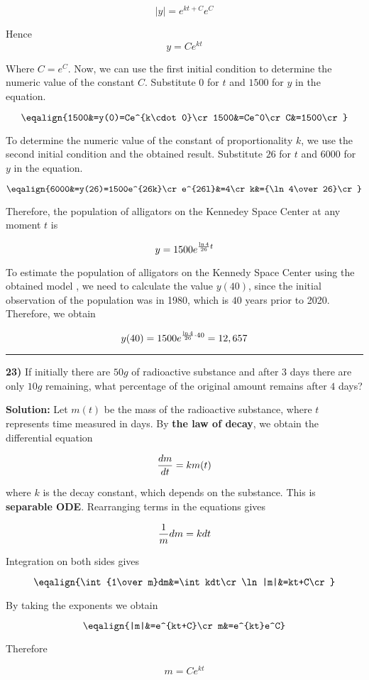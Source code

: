 $$|y|=e^{kt+C}e^C$$

Hence
$$y=Ce^{kt}$$

Where $C=e^C$. Now, we can use the first initial condition to determine the numeric value of the constant $C$. Substitute $0$ for $t$ and $1500$ for $y$ in the equation.

$$\eqalign{1500&=y(0)=Ce^{k\cdot 0}\cr
	1500&=Ce^0\cr
	C&=1500\cr}$$

To determine the numeric value of the constant of proportionality $k$, we use the second initial condition and the obtained result. Substitute $26$ for $t$ and $6000$ for $y$ in the equation.

$$\eqalign{6000&=y(26)=1500e^{26k}\cr
	e^{26l}&=4\cr
	k&={\ln 4\over 26}\cr}$$

Therefore, the population of alligators on the Kennedey Space Center at any moment $t$ is

$$y=1500e^{{\ln 4\over 26}t}$$

To estimate the population of alligators on the Kennedy Space Center using the obtained model , we need to calculate the value $y(40)$, since the initial observation of the population was in 1980, which is $40$ years prior to 2020. Therefore, we obtain

$$y(40)=1500e^{{\ln 4\over 26}\cdot 40}=12,657$$

\vskip 1mm
\hrule

\vskip 1cm
{\bf 23)} If initially there are $50g$ of radioactive substance and after $3$ days there are only $10g$ remaining, what percentage of the original amount remains after $4$ days?

\vskip 1cm
{\bf Solution:} Let $m(t)$ be the mass of the radioactive substance, where $t$ represents time measured in days. By {\bf the law of decay}, we obtain the differential equation

$${dm\over dt}=km(t)$$

where $k$ is the decay constant, which depends on the substance. This is {\bf separable ODE}. Rearranging terms in the equations gives

$${1\over m}dm=kdt$$

Integration on both sides gives

$$\eqalign{\int{1\over m}dm&=\int kdt\cr
		\ln|m|&=kt+C\cr}$$

By taking the exponents we obtain

$$\eqalign{|m|&=e^{kt+C}\cr
	m&=e^{kt}e^C}$$

Therefore

$$m=Ce^{kt}$$

